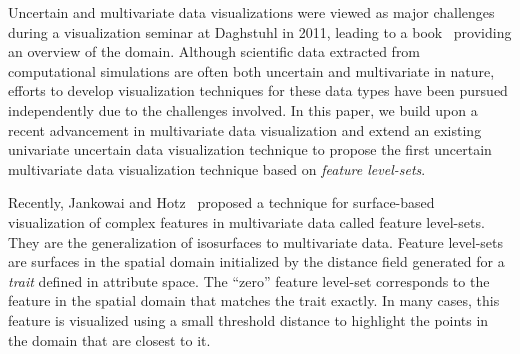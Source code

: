 Uncertain and multivariate data visualizations were viewed as major challenges during a visualization seminar at Daghstuhl in 2011, leading to a book~\cite{hansen2014scientific} providing an overview of the domain. 
%
Although scientific data extracted from computational simulations are often both uncertain and multivariate in nature, efforts to develop visualization techniques for these data types have been pursued independently due to the challenges involved.
%
In this paper, we build upon a recent advancement in multivariate data visualization and extend an existing univariate uncertain data visualization technique to propose the first uncertain multivariate data visualization technique based on \textit{feature level-sets}.

Recently, Jankowai and Hotz~\cite{jankowai2020feature} proposed a technique for surface-based visualization of complex features in multivariate data called feature level-sets. 
%
They are the generalization of isosurfaces to multivariate data.
%
Feature level-sets are surfaces in the spatial domain initialized by the distance field generated for a \textit{trait} defined in attribute space.
%
The ``zero'' feature level-set corresponds to the feature in the spatial domain that matches the trait exactly.
%
In many cases, this feature is visualized using a small threshold distance to highlight the points in the domain that are closest to it. 
%
%

